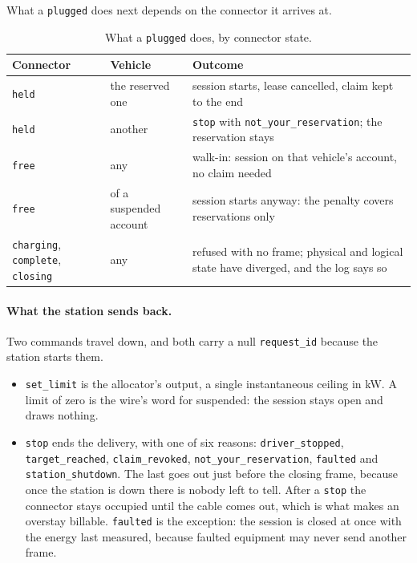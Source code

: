 What a \texttt{plugged} does next depends on the connector it arrives at.

\begin{table}[h]
\centering\small
\renewcommand{\arraystretch}{1.15}
\caption{What a \texttt{plugged} does, by connector state.}
\label{tab:plugged}
\begin{tabularx}{\textwidth}{@{}l l X@{}}
\toprule
Connector & Vehicle & Outcome \\
\midrule
\texttt{held} & the reserved one & session starts, lease cancelled, claim kept to the end \\
\texttt{held} & another & \texttt{stop} with \texttt{not\_your\_reservation}; the
  reservation stays \\
\texttt{free} & any & walk-in: session on that vehicle's account, no claim needed \\
\texttt{free} & of a suspended account & session starts anyway: the penalty covers
  reservations only \\
\texttt{charging}, \texttt{complete}, \texttt{closing} & any & refused with no frame;
  physical and logical state have diverged, and the log says so \\
\bottomrule
\end{tabularx}
\end{table}

\paragraph{What the station sends back.} Two commands travel down, and both carry a null
\texttt{request\_id} because the station starts them.

\begin{itemize}
  \item \texttt{set\_limit} is the allocator's output, a single instantaneous ceiling in kW.
        A limit of zero is the wire's word for suspended: the session stays open and draws
        nothing.
  \item \texttt{stop} ends the delivery, with one of six reasons: \texttt{driver\_stopped},
        \texttt{target\_reached}, \texttt{claim\_revoked}, \texttt{not\_your\_reservation},
        \texttt{faulted} and \texttt{station\_shutdown}. The last goes out just before the
        closing frame, because once the station is down there is nobody left to tell.
        After a \texttt{stop} the connector stays occupied
        until the cable comes out, which is what makes an overstay billable.
        \texttt{faulted} is the exception: the session is closed at once with the energy
        last measured, because faulted equipment may never send another frame.
\end{itemize}


